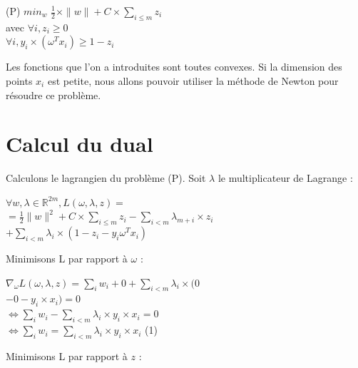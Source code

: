 \documentclass{article}
\begin{document}
           \begin{centre}
           (P) $min_{w}$ $\frac{1}{2} \times \|w\| + C \times \sum_{i \leq m}z_i$\\
           avec $\forall i, z_i \geq 0$\\
           $\forall i, y_i \times (\omega^{T} x_i) \geq 1 - z_i$\\
           \end{centre}

\bigskip

Les fonctions que l'on a introduites sont toutes convexes. Si la dimension des points $x_i$ est petite, nous allons pouvoir utiliser la méthode de Newton pour résoudre ce problème.

\section{Calcul du dual}

Calculons le lagrangien du problème (P). Soit $\lambda$ le multiplicateur de Lagrange :

              \begin{center}
              $\forall w, \lambda \in \mathbb{R}^{2m}, L(\omega, \lambda, z) = $\\
              $= \frac{1}{2} \|w\|^2 + C \times \sum_{i \leq m} z_i - \sum_{i < m} \lambda_{m+i} \times z_i$\\
              $+ \sum_{i < m} \lambda_i \times (1 - z_i - y_i \omega^{T} x_i)$\\
              \end{center}

Minimisons L par rapport à $\omega$ :\\

              \begin{center}
              $\nabla_{\omega} L(\omega, \lambda, z) = \sum_i w_i + 0 + \sum_{i < m} \lambda_i \times (0$\\
              $- 0 - y_i \times x_i) = 0$\\
              $\Leftrightarrow \sum_i w_i - \sum_{i < m} \lambda_i \times y_i \times x_i = 0$\\
              $\Leftrightarrow \sum_i w_i = \sum_{i < m} \lambda_i \times y_i \times x_i$ (1)\\
              \end{center}

Minimisons L par rapport à $z$ :\\
\end{document}
